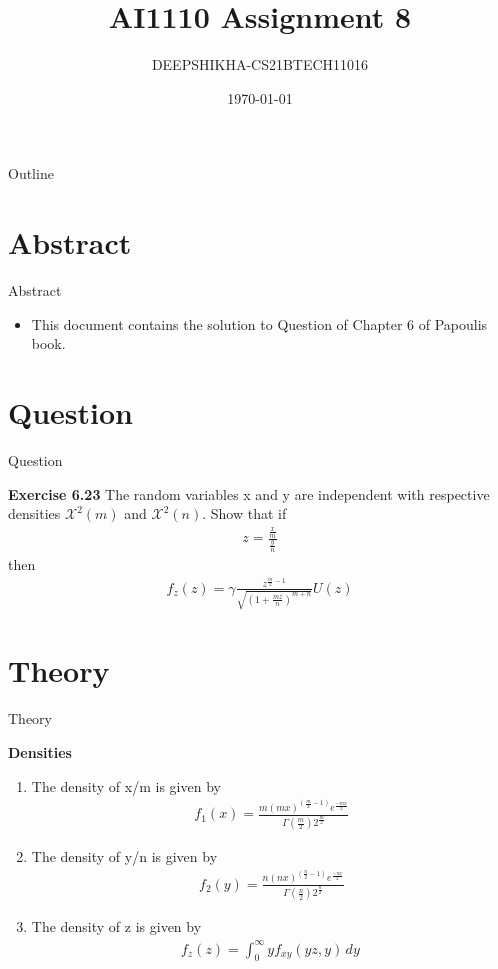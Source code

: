\documentclass{beamer}
\title{AI1110 Assignment 8}
\author{DEEPSHIKHA-CS21BTECH11016}
\date{\today}
\begin{document}
\begin{frame}
		\titlepage
	\end{frame}

\begin{frame}{Outline}
\begin{block}
\tableofcontents
\end{block}
\end{frame}

\section{Abstract}
\begin{frame}{Abstract}
\begin{itemize}
\item 	This document contains the solution to Question of Chapter 6 of Papoulis book.
\end{itemize}
\end{frame}
	
\section{Question}
\begin{frame}{Question}
\begin{block}{\textbf{ Exercise 6.23}}
The random variables x and y are independent with respective densities $\mathcal{X}^2(m)$ and $\mathcal{X}^2(n)$.
Show that if
\begin{align*}
    z=\frac{\frac{x}{m}}{\frac{y}{n}}
\end{align*}
then
\begin{align*}
    f_z(z)=\gamma \frac{z^{\frac{m}{2}-1}}{\sqrt{(1+\frac{mz}{n})^{m+n}}} U(z)
\end{align*}
\end{block}
\end{frame}
	
\section{Theory}
\begin{frame}{Theory}
\begin{block}{\textbf{Densities}}
\begin{enumerate}
    \item The density of x/m is given by
    \begin{align}
        f_1(x)=\frac{m{(mx)^{(\frac{m}{2}-1)}} e^{\frac{-mx}{2}}}{\Gamma(\frac{m}{2}) 2^{\frac{m}{2}}}
    \end{align}
    \item The density of y/n is given by
    \begin{align}
        f_2(y)=\frac{n{(nx)^{(\frac{n}{2}-1)}} e^{\frac{-nx}{2}}}{\Gamma(\frac{n}{2}) 2^{\frac{n}{2}}}
    \end{align}
    \item The density of z is given by
    \begin{align}
        f_z(z)=\int_{0}^{\infty} y f_{xy}(yz,y)\,dy\
    \end{align}
\end{enumerate}
\end{block}
\end{frame}
\end{document}
